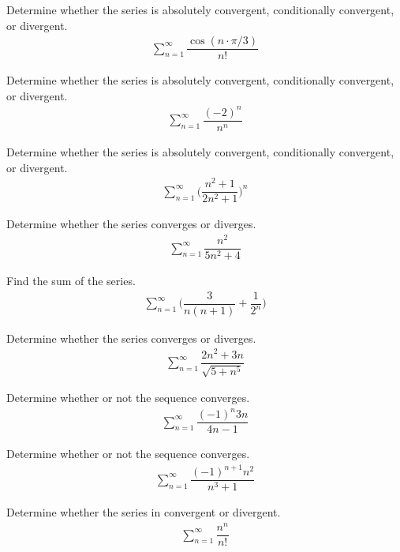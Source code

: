 \begin{exercise}
Determine whether the series is absolutely convergent, conditionally convergent, or divergent.
\begin{align*}
    \sum_{n=1}^{\infty} \dfrac{\cos(n\cdot\pi/3)}{n!}
\end{align*}
\end{exercise}

\begin{exercise}
Determine whether the series is absolutely convergent, conditionally convergent, or divergent.
\begin{align*}
    \sum_{n=1}^{\infty} \dfrac{(-2)^{n}}{n^{n}}
\end{align*}
\end{exercise}

\begin{exercise}
Determine whether the series is absolutely convergent, conditionally convergent, or divergent.
\begin{align*}
    \sum_{n=1}^{\infty} \Big(\dfrac{n^{2} + 1}{2n^{2} + 1}\Big)^{n}
\end{align*}
\end{exercise}

\begin{exercise}
Determine whether the series converges or diverges.
\begin{align*}
    \sum_{n=1}^{\infty} \dfrac{n^{2}}{5n^{2} + 4}
\end{align*}
\end{exercise}

\begin{exercise}
Find the sum of the series.
\begin{align*}
\sum_{n=1}^{\infty} \Big(\dfrac{3}{n(n+1)} + \dfrac{1}{2^{n}}\Big)
\end{align*}
\end{exercise}

\begin{exercise}
Determine whether the series converges or diverges.
\begin{align*}
    \sum_{n=1}^{\infty} \dfrac{2n^{2} + 3n}{\sqrt{5 + n^{5}}}
\end{align*}
\end{exercise}

\begin{exercise}
Determine whether or not the sequence converges.
\begin{align*}
    \sum_{n=1}^{\infty} \dfrac{(-1)^{n} 3n}{4n - 1}
\end{align*}
\end{exercise}

\begin{exercise}
Determine whether or not the sequence converges.
\begin{align*}
    \sum_{n=1}^{\infty} \dfrac{(-1)^{n+1}n^{2}}{n^{3} + 1}
\end{align*}
\end{exercise}

\begin{exercise}
Determine whether the series in convergent or divergent.
\begin{align*}
    \sum_{n=1}^{\infty} \dfrac{n^{n}}{n!}
\end{align*}
\end{exercise}